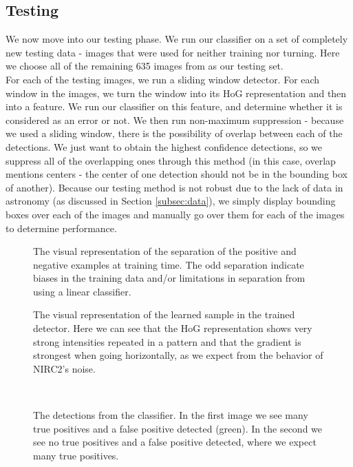 \documentclass[twocolumn,longauthor]{aastex61}
\begin{document}
\subsection{Testing} \label{subsec:testing}
\noindent We now move into our testing phase. We run our classifier on a set of completely new testing data - images that were used for neither training nor turning. Here we choose all of the remaining 635 images from \citet{2006ApJ..649..306} as our testing set.\\
\indent For each of the testing images, we run a sliding window detector. For each window in the images, we turn the window into its HoG representation and then into a feature. We run our classifier on this feature, and determine whether it is considered as an error or not. We then run non-maximum suppression - because we used a sliding window, there is the possibility of overlap between each of the detections. We just want to obtain the highest confidence detections, so we suppress all of the overlapping ones through this method (in this case, overlap mentions centers - the center of one detection should not be in the bounding box of another). Because our testing method is not robust due to the lack of data in astronomy (as discussed in Section \ref{subsec:data}), we simply display bounding boxes over each of the images and manually go over them for each of the images to determine performance.



\vspace{1em}
\begin{figure}[h!]
\vspace{1em}
\centering
{}
\caption{The visual representation of the separation of the positive and negative examples at training time. The odd separation indicate biases in the training data and/or limitations in separation from using a linear classifier.\label{fig:sep}}
\end{figure}

\begin{figure}[h!]
\centering
{}
\caption{The visual representation of the learned sample in the trained detector. Here we can see that the HoG representation shows very strong intensities repeated in a pattern and that the gradient is strongest when going horizontally, as we expect from the behavior of NIRC2's noise.\label{fig:hog}}
\end{figure}

\begin{figure}[h!]
\centering
{}
\vspace{1em}\\
\centering
{}
\caption{The detections from the classifier. In the first image we see many true positives and a false positive detected (green). In the second we see no true positives and a false positive detected, where we expect many true positives.\label{fig:img}}
\end{figure}
\end{document}

